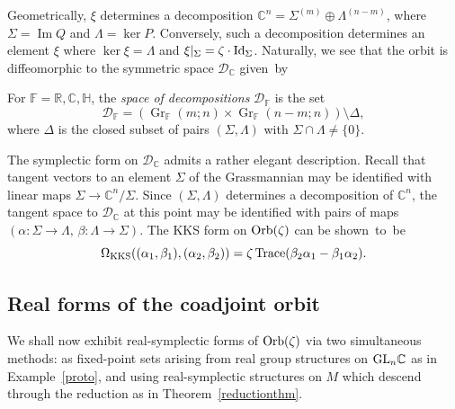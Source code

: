 \documentclass[pdftex]{sigma}
\numberwithin{equation}{section}
\DeclareMathOperator{\Imag}{Im}
\DeclareMathOperator{\Gr}{Gr}
\DeclareMathOperator{\Tr}{Trace}
\newcommand{\R}{\mathbb{R}}
\newcommand{\C}{\mathbb{C}}
\newcommand{\D}{\mathcal{D}}
\newcommand{\Q}{\mathbb{H}}
\newcommand{\Id}{{\rm Id}}
\begin{document}
Geometrically, $\xi$ determines a decomposition $\C^n=\Sigma^{(m)}\oplus \Lambda^{(n-m)}$, where ${\Sigma=\Imag Q}$ and $\Lambda=\ker P$. Conversely, such a decomposition determines an element $\xi$ where $\ker\xi=\Lambda$ and ${\xi|_\Sigma=\zeta\cdot\Id_\Sigma}$. Naturally, we see that the orbit is diffeomorphic to the symmetric space $\D_\C$ given~by
\begin{Definition}
	For $\mathbb{F}=\R,\C,\Q$, the \emph{space of decompositions} $\D_\mathbb{F}$ is the set
	\begin{equation}
		\label{elegant_A+B}
		\D_\mathbb{F}=(\Gr_\mathbb{F}(m;n)\times \Gr_\mathbb{F}(n-m;n))\setminus\Delta,
	\end{equation}
	where $\Delta$ is the closed subset of pairs $(\Sigma,\Lambda)$ with $\Sigma\cap\Lambda\ne\{0\}$.
\end{Definition}
\begin{Remark}\label{elegant_rmk}
	The symplectic form on $\D_{\C}$ admits a rather elegant description. Recall that tangent vectors to an element $\Sigma$ of the Grassmannian may be identified with linear maps ${\Sigma\rightarrow\C^n/\Sigma}$. Since $(\Sigma,\Lambda)$ determines a decomposition of $\C^n$, the tangent space to $\D_{\C}$ at this point may be identified with pairs of maps $(\alpha\colon\Sigma\rightarrow\Lambda,\,\beta\colon \Lambda\rightarrow\Sigma)$. The KKS form on ${\rm Orb}(\zeta)$ can be shown~to~be
	\[
		\Omega_{\rm KKS}((\alpha_1,\beta_1),(\alpha_2,\beta_2))=\zeta\Tr(\beta_2\alpha_1-\beta_1\alpha_2).
	\]
\end{Remark}

\subsection{Real forms of the coadjoint orbit}%

We shall now exhibit real-symplectic forms of ${\rm Orb}(\zeta)$ via two simultaneous methods: as fixed-point sets arising from real group structures on ${\rm GL}_n\C$ as in Example~\ref{proto}, and using real-symplectic structures on $M$ which descend through the reduction as in Theorem~\ref{reductionthm}.
\end{document}
